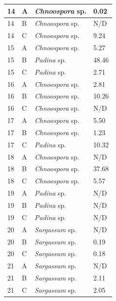 \documentclass[12pt]{article}
\begin{document}
\begin{longtable}{ | p{2cm} | p{2cm} | p{3cm} | p{3.5cm} |}
\hline
14&A&\emph{Chnoospora }sp.&0.02
\\
\hline
14&B&\emph{Chnoospora} sp.&N/D\\
\hline
14&C&\emph{Chnoospora }sp.&9.24
\\
\hline
15&A&\emph{Chnoospora }sp.&5.27
\\
\hline
15&B&\emph{Padina} sp. %
&48.46
\\
\hline
15&C&\emph{Padina} sp.%
&2.71
\\
\hline
16&A&%
\emph{Chnoospora }sp.&2.81
\\
\hline
16&B&%
\emph{Chnoospora }sp.&10.26
\\
\hline
16&C&\emph{Chnoospora }sp.&N/D\\
\hline
17&A&%
\emph{Chnoospora} sp.&5.50
\\
\hline
17&B&\emph{Chnoospora }sp.&1.23
\\
\hline
17&C&\emph{Padina} sp.&10.32
\\
\hline
18&A&\emph{Chnoospora }sp.&N/D\\
\hline
18&B&\emph{Chnoospora} sp.&37.68
\\
\hline
18&C&\emph{Chnoospora} sp.&5.57
\\
\hline
19&A&\emph{Padina} sp.&N/D\\%
\hline
19&B&\emph{Padina} sp.&N/D\\
\hline
19&C&\emph{Padina} sp.&N/D\\
\hline
20
&A&\emph{Sargassum} sp.&N/D\\
\hline
20
&B&\emph{Sargassum} sp.&0.19\\
\hline
20
&C&\emph{Sargassum} sp.&0.18\\
\hline
21
&A&\emph{Sargassum} sp.&N/D\\
\hline
21
&B&\emph{Sargassum} sp.&2.11\\
\hline
21
&C&\emph{Sargassum} sp.&2.05\\

\end{longtable}
\end{document}
